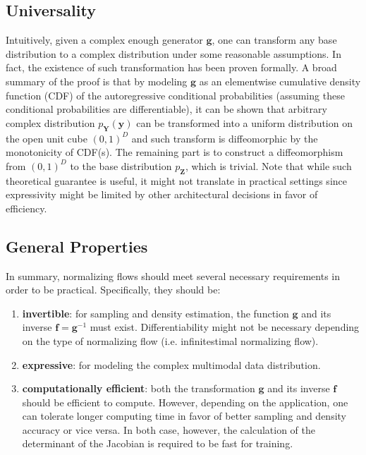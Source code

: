 \subsection{Universality}
\label{f:uni}

Intuitively, given a complex enough generator $\mathbf{g}$, one can transform
any base distribution to a complex distribution under some reasonable
assumptions. In fact, the existence of such transformation has been proven
formally. A broad summary of the proof is that by modeling $\mathbf{g}$ as an
elementwise cumulative density function (CDF) of the autoregressive conditional
probabilities (assuming these conditional probabilities are differentiable), it
can be shown that arbitrary complex distribution $p_{\mathbf{Y}}(\mathbf{y})$
can be transformed into a uniform distribution on the open unit cube $(0,1)^D$
and such transform is diffeomorphic by the monotonicity of CDF(s). The remaining
part is to construct a diffeomorphism from $(0,1)^D$ to the base distribution
$p_{\mathbf{Z}}$, which is trivial. Note that while such theoretical guarantee
is useful, it might not translate in practical settings since expressivity might be
limited by other architectural decisions in favor of efficiency.

\subsection{General Properties}

In summary, normalizing flows should meet several necessary requirements in
order to be practical. Specifically, they should be:
\begin{enumerate}
  \item \textbf{invertible}: for sampling and density estimation, the function
    $\mathbf{g}$ and its inverse $\mathbf{f} = \mathbf{g}^{-1}$ must exist.
    Differentiability might not be necessary depending on the type of
    normalizing flow (i.e. infinitestimal normalizing flow).
  \item \textbf{expressive}: for modeling the complex multimodal data distribution.
  \item \textbf{computationally efficient}: both the transformation $\mathbf{g}$
    and its inverse $\mathbf{f}$ should be efficient to compute. However,
    depending on the application, one can tolerate longer computing time in favor
    of better sampling and density accuracy or vice versa. In both case,
    however, the calculation of the determinant of the Jacobian is required to
    be fast for training.
\end{enumerate}

